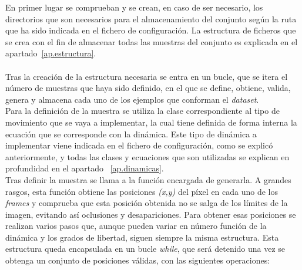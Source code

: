 \vspace{-10pt}
En primer lugar se comprueban y se crean, en caso de ser necesario, los directorios que son necesarios para el almacenamiento del conjunto según la ruta que ha sido indicada en el fichero de configuración. La estructura de ficheros que se crea con el fin de almacenar todas las muestras del conjunto es explicada en el apartado~\ref{ap.estructura}.\\
\vspace{20pt}
\\
Tras la creación de la estructura necesaria se entra en un bucle, que se itera el número de muestras que haya sido definido, en el que se define, obtiene, valida, genera y almacena cada uno de los ejemplos que conforman el \textit{dataset}.\\

Para la definición de la muestra se utiliza la clase correspondiente al tipo de movimiento que se vaya a implementar, la cual tiene definida de forma interna la ecuación que se corresponde con la dinámica. Este tipo de dinámica a implementar viene indicada en el fichero de configuración, como se explicó anteriormente, y todas las clases y ecuaciones que son utilizadas se explican en profundidad en el apartado
~\ref{ap.dinamicas}.\\

Tras definir la muestra se llama a la función encargada de generarla. A grandes rasgos, esta función obtiene las posiciones \textit{(x,y)} del píxel en cada uno de los \textit{frames} y comprueba que esta posición obtenida no se salga de los límites de la imagen, evitando así oclusiones y desapariciones. Para obtener esas posiciones se realizan varios pasos que, aunque pueden variar en número función de la dinámica y los grados de libertad, siguen siempre la misma estructura. Esta estructura queda encapsulada en un bucle \textit{while}, que será detenido una vez se obtenga un conjunto de posiciones válidas, con las siguientes operaciones:

